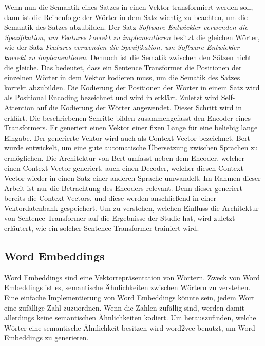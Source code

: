 Wenn nun die Semantik eines Satzes in einen Vektor transformiert werden soll, dann ist die Reihenfolge der Wörter in dem Satz wichtig zu beachten, um die Semantik des Satzes abzubilden.
Der Satz \textit{Software-Entwickler verwenden die Spezifikation, um Features korrekt zu implementieren} besitzt die gleichen Wörter, wie der Satz \textit{Features verwenden die Spezifikation, um Software-Entwickler korrekt zu implementieren}.
Dennoch ist die Sematik zwischen den Sätzen nicht die gleiche.
Das bedeutet, dass ein Sentence Transformer die Positionen der einzelnen Wörter in dem Vektor kodieren muss, um die Sematik des Satzes korrekt abzubilden.
Die Kodierung der Positionen der Wörter in einem Satz wird als Positional Encoding bezeichnet und wird in  erklärt.
Zuletzt wird Self-Attention auf die Kodierung der Wörter angewendet.
Dieser Schritt wird in  erklärt.
Die beschriebenen Schritte bilden zusammengefasst den Encoder eines Transformers.
Er generiert einen Vektor einer fixen Länge für eine beliebig lange Eingabe.
Der generierte Vektor wird auch als Context Vector bezeichnet.
Bert wurde entwickelt, um eine gute automatische Übersetzung zwischen Sprachen zu ermöglichen.
Die Architektur von Bert umfasst neben dem Encoder, welcher einen Context Vector generiert, auch einen Decoder, welcher diesen Context Vector wieder in einen Satz einer anderen Sprache umwandelt.
Im Rahmen dieser Arbeit ist nur die Betrachtung des Encoders relevant.
Denn dieser generiert bereits die Context Vectors, und diese werden anschließend in einer Vektordatenbank gespeichert.
Um zu verstehen, welchen Einfluss die Architektur von Sentence Transformer auf die Ergebnisse der Studie hat, wird zuletzt erläutert, wie ein solcher Sentence Transformer trainiert wird.

\subsection{Word Embeddings}
\label{chap:word-embeddings}
Word Embeddings sind eine Vektorrepräsentation von Wörtern.
Zweck von Word Embeddings ist es, semantische Ähnlichkeiten zwischen Wörtern zu verstehen.
Eine einfache Implementierung von Word Embeddings könnte sein, jedem Wort eine zufällige Zahl zuzuordnen.
Wenn die Zahlen zufällig sind, werden damit allerdings keine semantischen Ähnlichkeiten kodiert.
Um herauszufinden, welche Wörter eine semantische Ähnlichkeit besitzen wird word2vec benutzt, um Word Embeddings zu generieren.\\

